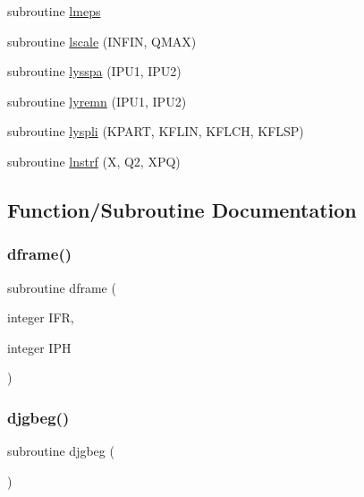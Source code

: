 \begin{DoxyCompactItemize}
\item 
subroutine \hyperlink{djangoh__l_8f_aa9cff44f133170139f6af5e0b9b955fe}{lmeps}
\item 
subroutine \hyperlink{djangoh__l_8f_a831b9ccf6317253a30b5f7f08c76ef03}{lscale} (I\+N\+F\+IN, Q\+M\+AX)
\item 
subroutine \hyperlink{djangoh__l_8f_ad96114ee498da69ba22dcdb67af32668}{lysspa} (I\+P\+U1, I\+P\+U2)
\item 
subroutine \hyperlink{djangoh__l_8f_a0aab017503862c0f617dc07da9bd8afe}{lyremn} (I\+P\+U1, I\+P\+U2)
\item 
subroutine \hyperlink{djangoh__l_8f_aa33ce25ab97aa9770a5e2e5f3980fd2e}{lyspli} (K\+P\+A\+RT, K\+F\+L\+IN, K\+F\+L\+CH, K\+F\+L\+SP)
\item 
subroutine \hyperlink{djangoh__l_8f_aaf60c1c6a99e30d85f81058b6c04912e}{lnstrf} (X, Q2, X\+PQ)
\end{DoxyCompactItemize}


\subsection{Function/\+Subroutine Documentation}
\mbox{\label{djangoh__l_8f_a2381dfce53fbaa48b3b2b9303fa19a97}} 
\subsubsection{\texorpdfstring{dframe()}{dframe()}}
{\footnotesize\ttfamily subroutine dframe (\begin{DoxyParamCaption}\item[{integer}]{I\+FR,  }\item[{integer}]{I\+PH }\end{DoxyParamCaption})}

\mbox{\label{djangoh__l_8f_ae6e9ed9cda4415025d1d496057a2d137}} 
\subsubsection{\texorpdfstring{djgbeg()}{djgbeg()}}
{\footnotesize\ttfamily subroutine djgbeg (\begin{DoxyParamCaption}{ }\end{DoxyParamCaption})}

